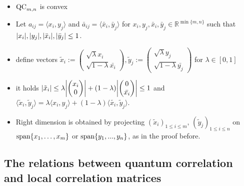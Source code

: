 \begin{frame}
	\begin{itemize}
		\item<1-> $ \textup{QC}_{m,n} $ is convex
		\item<2->Let $a_{ij} = \langle x_i, y_j \rangle $ and $ \bar{a}_{ij} = \langle \bar{x}_i, \bar{y}_j \rangle $ for $ x_{i},y_j, \bar{x}_i,\bar{y}_j \in \mathbb{R}^{\min \{m,n\}} $ such that $ {\left|{x_i}\right|},{\left|{y_j}\right|}, {\left|{\bar{x}_i}\right|}, {\left|{\bar{y}_j}\right|} \le 1 $.
		\item<3-> define vectors $\tilde{x}_i:= \begin{pmatrix}
		\sqrt{\lambda}x_i  \\ \sqrt{1-\lambda}\bar{x_i}
		\end{pmatrix}, \tilde{y}_j:= \begin{pmatrix}
		\sqrt{\lambda}y_j  \\ \sqrt{1-\lambda}\bar{y_j}
		\end{pmatrix} $ for $ \lambda \in [0,1] $
		\item<4-> it holds $ {\left|{\tilde{x}_i}\right|} \le \lambda {\left|{\begin{pmatrix}
			x_i \\ 0
			\end{pmatrix}}\right|} + (1-\lambda){\left|{\begin{pmatrix}
			0 \\ \bar{x_i}
			\end{pmatrix}}\right|} \le 1 $ and $ \langle \tilde{x}_i, \tilde{y}_j \rangle = \lambda \langle x_i,y_j \rangle + (1-\lambda) \langle \tilde{x_i},\tilde{y}_j \rangle$.
		\item<5-> Right dimension is obtained by projecting $ (\tilde{x}_i)_{1 \le i \le m}, \, (\tilde{y}_j)_{1 \le i \le n} $ on $\textup{span}\{x_1,\hdots,x_m\} $ or $\textup{span}\{y_1,...,y_n\} $, as in the proof before.
	\end{itemize}
\end{frame}
\subsection{The relations between quantum correlation and local correlation matrices}

